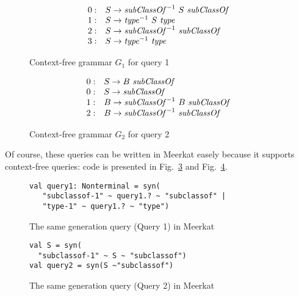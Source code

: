 \begin{figure}[h]
   \centering
   \[
\begin{array}{rl}
   0: & S \rightarrow \text{\textit{subClassOf}}^{-1} \ S \ \text{\textit{subClassOf}} \\
   1: & S \rightarrow \text{\textit{type}}^{-1} \ S \ \text{\textit{type}} \\
   2: & S \rightarrow \text{\textit{subClassOf}}^{-1} \ \text{\textit{subClassOf}} \\
   3: & S \rightarrow \text{\textit{type}}^{-1} \ \text{\textit{type}} \\
\end{array}
\]
   \caption{Context-free grammar $G_1$ for query 1}
   \label{grammarQ1}
   \end{figure}

\begin{figure}[h]
   \centering
   \[
\begin{array}{rl}
   0: & S \rightarrow B \ \text{\textit{subClassOf}} \\
   0: & S \rightarrow \text{\textit{subClassOf}} \\
   1: & B \rightarrow \text{\textit{subClassOf}}^{-1} \ B \ \text{\textit{subClassOf}} \\
   2: & B \rightarrow \text{\textit{subClassOf}}^{-1} \ \text{\textit{subClassOf}} \\
\end{array}
\]
   \caption{Context-free grammar $G_2$ for query 2}
   \label{grammarQ2}
   \end{figure}

   Of course, these queries can be written in Meerkat easely because it supports context-free queries: code is presented in Fig.~\ref{fig:query1Meerkat} and Fig.~\ref{fig:query2Meerkat}.

\begin{figure}[h]
\begin{lstlisting}
val query1: Nonterminal = syn(
   "subclassof-1" ~ query1.? ~ "subclassof" |
   "type-1" ~ query1.? ~ "type")
\end{lstlisting}
\caption{The same generation query (Query 1) in Meerkat}
\label{fig:query1Meerkat}
\end{figure}


\begin{figure}[h]
\begin{lstlisting}
val S = syn(
  "subclassof-1" ~ S ~ "subclassof")
val query2 = syn(S ~"subclassof")
\end{lstlisting}
\caption{The same generation query (Query 2) in Meerkat}
\label{fig:query2Meerkat}
\end{figure}

